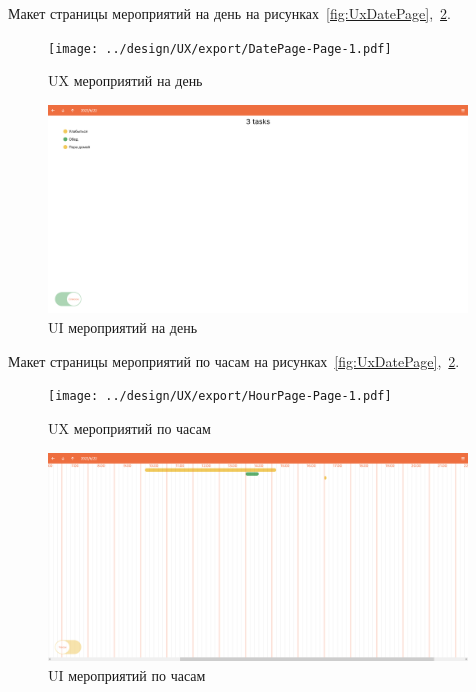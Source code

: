 Макет страницы мероприятий на день на рисунках~\ref{fig:UxDatePage},~\ref{fig:UiDatePage}.

\begin{figure}[!h]
  \centering
  \begin{minipage}{0.32\textwidth}
    \centering
    \texttt{[image: ../design/UX/export/DatePage-Page-1.pdf]}
    \caption{UX мероприятий на день}
    \label{fig:UxDatePage}
  \end{minipage}
  \begin{minipage}{0.66\textwidth}
    \centering
    \includegraphics[width=0.99\textwidth]
    {images/screenshots/DatePage.png}
    \caption{UI мероприятий на день}
    \label{fig:UiDatePage}
  \end{minipage}
\end{figure}

Макет страницы мероприятий по часам на рисунках~\ref{fig:UxDatePage},~\ref{fig:UiDatePage}.

\begin{figure}[!h]
  \centering
  \begin{minipage}{0.32\textwidth}
    \centering
    \texttt{[image: ../design/UX/export/HourPage-Page-1.pdf]}
    \caption{UX мероприятий по часам}
    \label{fig:UxDatePage}
  \end{minipage}
  \begin{minipage}{0.66\textwidth}
    \centering
    \includegraphics[width=0.99\textwidth]
    {images/screenshots/HourPage.png}
    \caption{UI мероприятий по часам}
    \label{fig:UiDatePage}
  \end{minipage}
\end{figure}

